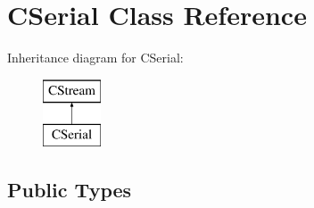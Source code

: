 \hypertarget{class_c_serial}{\section{C\-Serial Class Reference}
\label{class_c_serial}
}
Inheritance diagram for C\-Serial\-:\begin{figure}[H]
\begin{center}
\leavevmode
\includegraphics[height=2.000000cm]{class_c_serial}
\end{center}
\end{figure}
\subsection*{Public Types}
